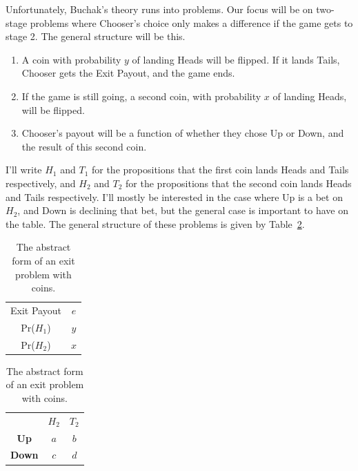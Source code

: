 \documentclass[
  12pt,
  letterpaper,
  DIV=11,
  numbers=noendperiod]{scrreprt}
\providecommand{\tightlist}{%
  \setlength{\itemsep}{0pt}\setlength{\parskip}{0pt}}\usepackage{longtable,booktabs,array}
\begin{document}
Unfortunately, Buchak's theory runs into problems. Our focus will be on
two-stage problems where Chooser's choice only makes a difference if the
game gets to stage 2. The general structure will be this.

\begin{enumerate}
\def\labelenumi{\arabic{enumi}.}
\tightlist
\item
  A coin with probability \(y\) of landing Heads will be flipped. If it
  lands Tails, Chooser gets the Exit Payout, and the game ends.
\item
  If the game is still going, a second coin, with probability \(x\) of
  landing Heads, will be flipped.
\item
  Chooser's payout will be a function of whether they chose Up or Down,
  and the result of this second coin.
\end{enumerate}

I'll write \(H_1\) and \(T_1\) for the propositions that the first coin
lands Heads and Tails respectively, and \(H_2\) and \(T_2\) for the
propositions that the second coin lands Heads and Tails respectively.
I'll mostly be interested in the case where Up is a bet on \(H_2\), and
Down is declining that bet, but the general case is important to have on
the table. The general structure of these problems is given by
Table~\ref{tbl-general-coin-exit}.

\begin{table}

\caption{\label{tbl-general-coin-exit}The abstract form of an exit
problem with coins.}\begin{minipage}[t]{0.50\linewidth}

{\centering 

\begin{tabular}[t]{cc}
\toprule
Exit Payout & \(e\)\\
Pr(\(H_1\)) & \(y\)\\
Pr(\(H_2\)) & \(x\)\\
\bottomrule
\end{tabular}

}

\end{minipage}%
%
\begin{minipage}[t]{0.50\linewidth}

{\centering 

\begin{tabular}[t]{ccc}
\toprule
 & \(H_2\) & \(T_2\)\\
\textbf{Up} & \(a\) & \(b\)\\
\textbf{Down} & \(c\) & \(d\)\\
\bottomrule
\end{tabular}

}

\end{minipage}%

\end{table}
\end{document}
